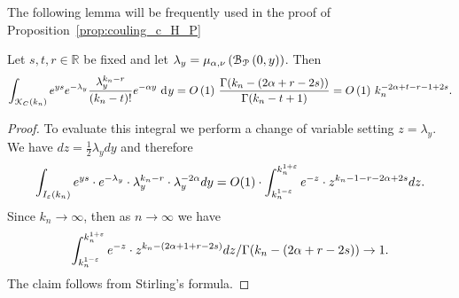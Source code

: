The following lemma will be frequently used in the proof of Proposition~\ref{prop:couling_c_H_P}
\begin{lemma} \label{eq:gamma_approx}
Let $s, t, r \in \mathbb{R}$ be fixed and let $\lambda_y = \mu_{\alpha,\nu}\left({\mathcal B}_{{\mathcal P}}\left(0,y\right)\right)$. Then 
\[
	\int_{{\mathcal K}_{C}(k_n)} e^{ys} e^{-\lambda_y} \frac{\lambda_y^{k_n-r}}{(k_n-t)!}e^{-\alpha y} \operatorname{\, \mathrm{d}\hspace{-1pt}} y =
	O\left(1\right) \, \frac{\Gamma (k_n- (2\alpha +r -2s))}{\Gamma(k_n-t+1)} = O\left(1\right) \, k_n^{-2\alpha+t-r-1+ 2s}.
\]
\end{lemma}
\begin{proof}
To evaluate this integral we perform a change of variable setting $z=\lambda_y$. 
We have $dz =\frac{1}{2} \lambda_y dy$ and therefore 
\begin{equation} \label{eq:gamma_approx_I}
 \int_{I_\varepsilon (k_n)} e^{ys} \cdot e^{-\lambda_y} \cdot \lambda_y^{k_n-r} \cdot \lambda_y^{-2\alpha}  dy = O(1) \cdot \int_{k_n^{1-\varepsilon}}^{k_n^{1+\varepsilon}} e^{-z} \cdot z^{k_n-1-r-2\alpha+2s}  dz. 
 \end{equation}
Since $k_n\to \infty$, then as $n\to \infty$ we have 
\begin{equation} \label{eq:gamma_approx_II}
\int_{k_n^{1-\varepsilon}}^{k_n^{1+\varepsilon}} e^{-z} \cdot z^{k_n-(2\alpha+1+r-2s)}  dz / \Gamma (k_n-(2\alpha+r -2s)) \to 1.
\end{equation}
The claim follows from Stirling's formula.
\end{proof}



